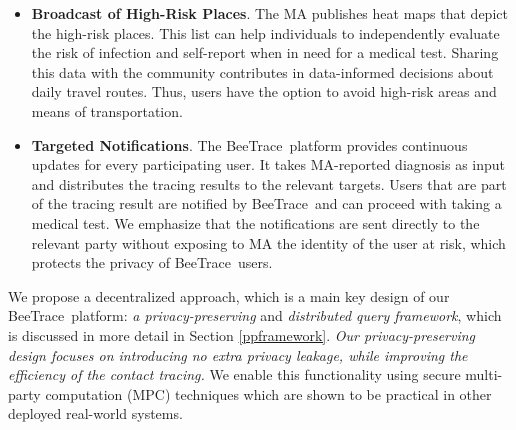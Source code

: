 \documentclass[11pt]{article}  %
\newcommand{\sysname}{\textsf{BeeTrace}\xspace}
\begin{document}

\begin{itemize}
    \item \textbf{Broadcast of High-Risk Places}. The MA publishes heat maps that depict the high-risk places. %
    This list can help individuals to independently evaluate the risk of infection and self-report when in need for a medical test. Sharing this data with the community contributes in data-informed decisions about daily travel routes. Thus, users have the option to avoid high-risk areas and means of transportation. 
    \item \textbf{Targeted Notifications}. The \sysname\ platform provides continuous updates for every participating user. It takes MA-reported diagnosis as input and distributes the tracing results to the relevant targets. Users that are part of the tracing result are notified by \sysname\ and can proceed with taking a medical test. We emphasize that the notifications are sent directly to the relevant party without exposing to MA the identity of the user at risk, which protects the privacy of \sysname\ users.
\end{itemize}

We propose a decentralized approach, which is a main key design of our \sysname\ platform: \emph{a privacy-preserving} and \emph{distributed query framework}, which is discussed in more detail in Section \ref{ppframework}. 
\emph{Our privacy-preserving design focuses on introducing no extra privacy leakage, while improving the efficiency of the contact tracing.} 
We enable this functionality using secure multi-party computation (MPC) techniques which are shown to be practical in other deployed real-world systems.
\end{document}

